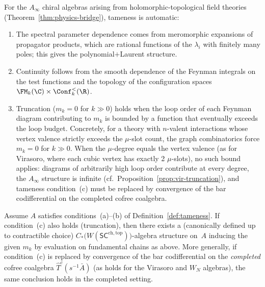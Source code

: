 \begin{remark}
\label{rem:tameness-HT}
For the $A_\infty$ chiral algebras arising from holomorphic-topological
field theories (Theorem~\ref{thm:physics-bridge}), tameness is
automatic:
\begin{enumerate}[label=\textup{(\alph*)}]
\item The spectral parameter dependence comes from meromorphic
 expansions of propagator products, which are rational functions of the
 $\lambda_i$ with finitely many poles; this gives the
 polynomial$+$Laurent structure.
\item Continuity follows from the smooth dependence of the Feynman
 integrals on the test functions and the topology of the configuration
 spaces $\FM_k(\C) \times \Conf_k^{<}(\R)$.
\item Truncation ($m_k = 0$ for $k \gg 0$) holds when the loop order of
 each Feynman diagram contributing to $m_k$ is bounded by a function
 that eventually exceeds the loop budget. Concretely, for a theory
 with $n$-valent interactions whose vertex valence strictly exceeds the
 $\mu$-slot count, the graph combinatorics force $m_k = 0$ for
 $k \gg 0$. When the $\mu$-degree equals the vertex valence (as for
 Virasoro, where each cubic vertex has exactly 2 $\mu$-slots), no such
 bound applies: diagrams of arbitrarily high loop order contribute at
 every degree, the $A_\infty$ structure is infinite
 (cf.\ Proposition~\ref{prop:vir-truncation}), and tameness
 condition~(c) must be replaced by convergence of the bar codifferential
 on the completed cofree coalgebra.
\end{enumerate}
\end{remark}

\begin{theorem}
\label{thm:rectification}
Assume $A$ satisfies conditions~\textup{(a)--(b)} of Definition~\ref{def:tameness}. If condition~\textup{(c)} also holds (truncation), then there exists a (canonically defined up to contractible choice) $C_\ast\!\bigl(W(\mathsf{SC}^{\mathrm{ch,top}})\bigr)$-algebra structure on~$A$ inducing the given $m_k$ by evaluation on fundamental chains as above. More generally, if condition~\textup{(c)} is replaced by convergence of the bar codifferential on the \emph{completed} cofree coalgebra $\widehat{T}^c(s^{-1}\bar{A})$ (as holds for the Virasoro and $W_N$ algebras), the same conclusion holds in the completed setting.
\end{theorem}

